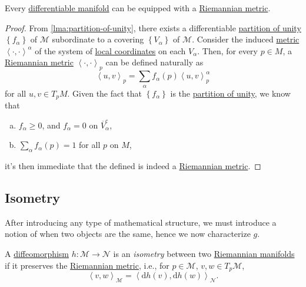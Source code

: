\begin{theorem}
	Every \hyperref[def:smooth-manifold]{differentiable manifold} can be equipped with a \hyperref[def:Riemannian-metric]{Riemannian metric}.
\end{theorem}
\begin{proof}
	From \autoref{lma:partition-of-unity}, there exists a differentiable \hyperref[def:partition-of-unity]{partition of unity} \(\left\{ f_\alpha \right\} \) of \(\mathcal{M} \) subordinate to a covering \(\left\{ V_\alpha \right\} \) of \(\mathcal{M} \). Consider the induced \hyperref[def:Riemannian-metric]{metric} \( \left\langle \cdot, \cdot \right\rangle ^{\alpha }\) of the system of \hyperref[def:coordinate-chart]{local coordinates} on each \(V_\alpha \). Then, for every \(p\in M\), a \hyperref[def:Riemannian-metric]{Riemannian metric} \(\left\langle \cdot, \cdot \right\rangle _p\) can be defined naturally as
	\[
		\left\langle u, v \right\rangle _p = \sum_{\alpha } f_\alpha (p)\left\langle u, v \right\rangle _p^\alpha
	\]
	for all \(u, v\in T_p M \). Given the fact that \(\left\{ f_\alpha \right\} \) is the \hyperref[def:partition-of-unity]{partition of unity}, we know that
	\begin{enumerate}[(a)]
		\item \(f_\alpha \geq 0\), and \(f_\alpha = 0\) on \(\overline{V} _\alpha ^{c} \),
		\item \(\sum_{\alpha } f_\alpha (p) = 1\) for all \(p\) on \(M\),
	\end{enumerate}
	it's then immediate that the defined is indeed a \hyperref[def:Riemannian-metric]{Riemannian metric}.
\end{proof}

\subsection{Isometry}
After introducing any type of mathematical structure, we must introduce a notion of when two objects are the same, hence we now characterize \(g\).

\begin{definition}[Isometry]\label{def:isometry}
	A \hyperref[def:diffeomorphism]{diffeomorphism} \(h\colon \mathcal{M} \to \mathcal{N} \) is an \emph{isometry} between two \hyperref[def:Riemannian-manifold]{Riemannian manifolds} if it preserves the \hyperref[def:Riemannian-metric]{Riemannian metric}, i.e., for \(p\in \mathcal{M} \), \(v, w\in T_p \mathcal{M} \),
	\[
		\left\langle v, w \right\rangle _{\mathcal{M} } = \left\langle \mathrm{d} h(v), \mathrm{d} h(w) \right\rangle _{\mathcal{N} }.
	\]
\end{definition}

